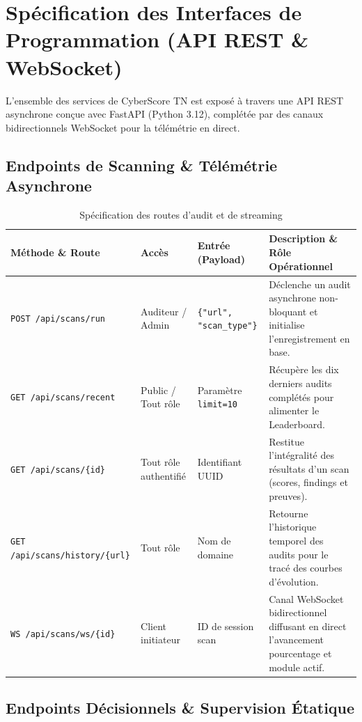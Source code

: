 \chapter[Spécification des APIs]{Spécification des Interfaces de Programmation (API REST \& WebSocket)}
\label{anx:api}

L'ensemble des services de CyberScore TN est exposé à travers une API REST asynchrone conçue avec FastAPI (Python 3.12), complétée par des canaux bidirectionnels WebSocket pour la télémétrie en direct.

\section{Endpoints de Scanning \& Télémétrie Asynchrone}

\begin{table}[!htbp]
\centering
\caption{Spécification des routes d'audit et de streaming}
\label{tab:api_scans}
\begin{singlespace}
\footnotesize
\renewcommand{\arraystretch}{1.1}
\begin{tabularx}{\textwidth}{p{3.2cm} l p{3.2cm} X}
\toprule
\textbf{Méthode \& Route} & \textbf{Accès} & \textbf{Entrée (Payload)} & \textbf{Description \& Rôle Opérationnel} \\
\midrule
\texttt{POST /api/scans/run} & Auditeur / Admin & \texttt{\{"url", "scan\_type"\}} & Déclenche un audit asynchrone non-bloquant et initialise l'enregistrement en base. \\
\texttt{GET /api/scans/recent} & Public / Tout rôle & Paramètre \texttt{limit=10} & Récupère les dix derniers audits complétés pour alimenter le Leaderboard. \\
\texttt{GET /api/scans/\{id\}} & Tout rôle authentifié & Identifiant UUID & Restitue l'intégralité des résultats d'un scan (scores, findings et preuves). \\
\texttt{GET /api/scans/history/\{url\}} & Tout rôle & Nom de domaine & Retourne l'historique temporel des audits pour le tracé des courbes d'évolution. \\
\texttt{WS /api/scans/ws/\{id\}} & Client initiateur & ID de session scan & Canal WebSocket bidirectionnel diffusant en direct l'avancement pourcentage et module actif. \\
\bottomrule
\end{tabularx}
\end{singlespace}
\end{table}

\section{Endpoints Décisionnels \& Supervision Étatique}

